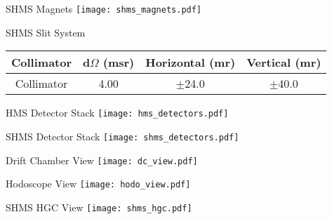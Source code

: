 \begin{Mfigure}{SHMS Magnets}
  \centering
  \texttt{[image: shms\_magnets.pdf]}
  \caption{Overview of SHMS optical setup.}
  \label{fig:2-4_shms_magnets}
\end{Mfigure}

\begin{Mtable}{SHMS Slit System}
  \centering
  \begin{tabular}{|c|c|c|c|}
    \hline
    \textbf{Collimator} & \textbf{d$\Omega$ (msr)} & \textbf{Horizontal (mr)} & \textbf{Vertical (mr)} \\
    \hline
     Collimator & 4.00 & $\pm$24.0 & $\pm$40.0 \\
    \hline
  \end{tabular}
  \caption{Breakdown of SHMS slit system's apertures.}
  \label{tab:2-4_shms_slit}
\end{Mtable}

\begin{Mfigure}{HMS Detector Stack}
  \centering
  \texttt{[image: hms\_detectors.pdf]}
  \caption{Overview of HMS Detector Stack.}
  \label{fig:2-4_hms_detectors}
\end{Mfigure}

\begin{Mfigure}{SHMS Detector Stack}
  \centering
  \texttt{[image: shms\_detectors.pdf]}
  \caption{Overview of SHMS Detector Stack.}
  \label{fig:2-4_shms_detectors}
\end{Mfigure}

\begin{Mfigure}{Drift Chamber View}
  \centering
  \texttt{[image: dc\_view.pdf]}
  \caption{Basic design and components of DC1 (left) and DC2 (right).}
  \label{fig:2-4_dc_view}
\end{Mfigure}

\begin{Mfigure}{Hodoscope View}
  \centering
  \texttt{[image: hodo\_view.pdf]}
  \caption{Basic design of a hodoscope pair.}
  \label{fig:2-4_hodo_view}
\end{Mfigure}

\begin{Mfigure}{SHMS HGC View}
  \centering
  \texttt{[image: shms\_hgc.pdf]}
  \caption{View of the SHMS Heavy Gas Cerenkov's four mirrors and PMTs. [\cite{sta_jeerson_2019}]}
  \label{fig:2-4_shms_hgc}
\end{Mfigure}

